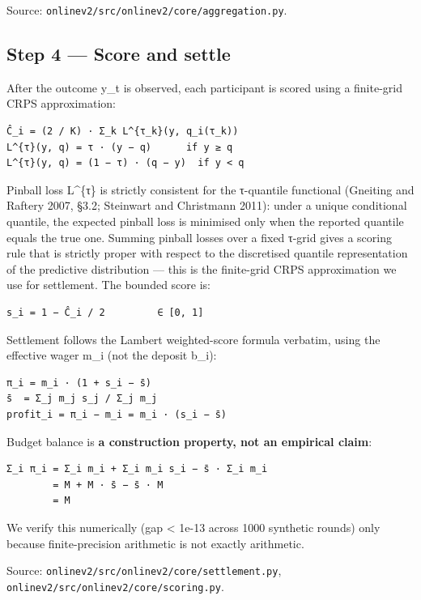 \documentclass[11pt,a4paper,openany]{report}
\begin{document}
Source: \texttt{onlinev2/src/onlinev2/core/aggregation.py}.

\subsection{Step 4 — Score and settle}

After the outcome y\_t is observed, each participant is scored using a
finite-grid CRPS approximation:

\begin{verbatim}
Ĉ_i = (2 / K) · Σ_k L^{τ_k}(y, q_i(τ_k))
L^{τ}(y, q) = τ · (y − q)      if y ≥ q
L^{τ}(y, q) = (1 − τ) · (q − y)  if y < q
\end{verbatim}

Pinball loss L\textasciicircum{}\{τ\} is strictly consistent for the τ-quantile functional
(Gneiting and Raftery 2007, §3.2; Steinwart and Christmann 2011): under
a unique conditional quantile, the expected pinball loss is minimised
only when the reported quantile equals the true one. Summing pinball
losses over a fixed τ-grid gives a scoring rule that is strictly proper
with respect to the discretised quantile representation of the
predictive distribution — this is the finite-grid CRPS approximation
we use for settlement. The bounded score is:

\begin{verbatim}
s_i = 1 − Ĉ_i / 2         ∈ [0, 1]
\end{verbatim}

Settlement follows the Lambert weighted-score formula verbatim, using
the effective wager m\_i (not the deposit b\_i):

\begin{verbatim}
π_i = m_i · (1 + s_i − s̄)
s̄  = Σ_j m_j s_j / Σ_j m_j
profit_i = π_i − m_i = m_i · (s_i − s̄)
\end{verbatim}

Budget balance is \textbf{a construction property, not an empirical claim}:

\begin{verbatim}
Σ_i π_i = Σ_i m_i + Σ_i m_i s_i − s̄ · Σ_i m_i
        = M + M · s̄ − s̄ · M
        = M
\end{verbatim}

We verify this numerically (gap < 1e-13 across 1000 synthetic rounds)
only because finite-precision arithmetic is not exactly arithmetic.

Source: \texttt{onlinev2/src/onlinev2/core/settlement.py},
\texttt{onlinev2/src/onlinev2/core/scoring.py}.
\end{document}
